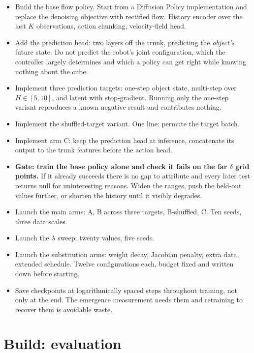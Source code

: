 \documentclass[9pt]{extarticle}
\newcommand{\ck}{\item[$\square$]}
\begin{document}
\begin{itemize}
\ck Build the base flow policy. Start from a Diffusion Policy implementation and replace the denoising objective with rectified flow. History encoder over the last $K$ observations, action chunking, velocity-field head.
\ck Add the prediction head: two layers off the trunk, predicting the \emph{object's} future state. Do not predict the robot's joint configuration, which the controller largely determines and which a policy can get right while knowing nothing about the cube.
\ck Implement three prediction targets: one-step object state, multi-step over $H \in [5,10]$, and latent with stop-gradient. Running only the one-step variant reproduces a known negative result and contributes nothing.
\ck Implement the shuffled-target variant. One line: permute the target batch.
\ck Implement arm C: keep the prediction head at inference, concatenate its output to the trunk features before the action head.
\ck \textbf{Gate: train the base policy alone and check it fails on the far $\delta$ grid points.} If it already succeeds there is no gap to attribute and every later test returns null for uninteresting reasons. Widen the ranges, push the held-out values further, or shorten the history until it visibly degrades.
\ck Launch the main arms: A, B across three targets, B-shuffled, C. Ten seeds, three data scales.
\ck Launch the $\lambda$ sweep: twenty values, five seeds.
\ck Launch the substitution arms: weight decay, Jacobian penalty, extra data, extended schedule. Twelve configurations each, budget fixed and written down before starting.
\ck Save checkpoints at logarithmically spaced steps throughout training, not only at the end. The emergence measurement needs them and retraining to recover them is avoidable waste.
\end{itemize}

\section{Build: evaluation}
\end{document}
